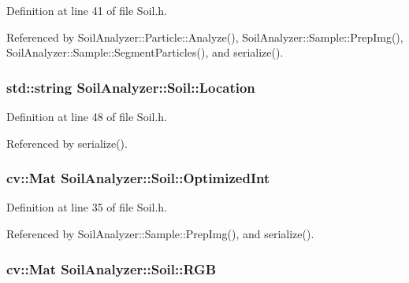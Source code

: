 Definition at line 41 of file Soil.\+h.



Referenced by Soil\+Analyzer\+::\+Particle\+::\+Analyze(), Soil\+Analyzer\+::\+Sample\+::\+Prep\+Img(), Soil\+Analyzer\+::\+Sample\+::\+Segment\+Particles(), and serialize().

\hypertarget{class_soil_analyzer_1_1_soil_a9c3cabd71691bfc4bb56d32fdb298e72}{}
\subsubsection[{Location}]{\setlength{\rightskip}{0pt plus 5cm}std\+::string Soil\+Analyzer\+::\+Soil\+::\+Location}\label{class_soil_analyzer_1_1_soil_a9c3cabd71691bfc4bb56d32fdb298e72}


Definition at line 48 of file Soil.\+h.



Referenced by serialize().

\hypertarget{class_soil_analyzer_1_1_soil_a27f7c15f63cbf64c07ceedb30c25e861}{}
\subsubsection[{Optimized\+Int}]{\setlength{\rightskip}{0pt plus 5cm}cv\+::\+Mat Soil\+Analyzer\+::\+Soil\+::\+Optimized\+Int\hspace{0.3cm}{\ttfamily [protected]}}\label{class_soil_analyzer_1_1_soil_a27f7c15f63cbf64c07ceedb30c25e861}


Definition at line 35 of file Soil.\+h.



Referenced by Soil\+Analyzer\+::\+Sample\+::\+Prep\+Img(), and serialize().

\hypertarget{class_soil_analyzer_1_1_soil_a4a328e0ebe7f1f3c5a1c4c581180d19e}{}
\subsubsection[{R\+G\+B}]{\setlength{\rightskip}{0pt plus 5cm}cv\+::\+Mat Soil\+Analyzer\+::\+Soil\+::\+R\+G\+B}\label{class_soil_analyzer_1_1_soil_a4a328e0ebe7f1f3c5a1c4c581180d19e}


